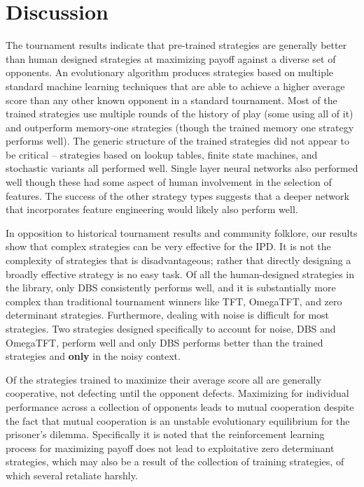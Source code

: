 \documentclass{article}
\begin{document}
\section{Discussion}

The tournament results indicate that pre-trained strategies are generally better
than human designed strategies at maximizing payoff against a diverse set of
opponents. An evolutionary algorithm produces strategies based on multiple
standard machine learning techniques that are able to achieve a higher average
score than any other known opponent in a standard tournament. Most of the trained
strategies use multiple rounds of the history of play (some using all of it) and
outperform memory-one strategies (though the trained memory one strategy performs
well). The generic structure of the trained strategies did not appear to be
critical -- strategies based on lookup tables, finite state machines, and stochastic
variants all performed well. Single layer neural networks also performed well
though these had some aspect of human involvement in the selection of features.
The success of the other strategy types suggests that a deeper network that
incorporates feature engineering would likely also perform well.

In opposition to historical tournament results and community folklore,
our results show that complex strategies can be very effective for the
IPD\@. It is not the complexity of strategies that is disadvantageous; rather that directly
designing a broadly effective strategy is no easy task. Of all the human-designed
strategies in the library, only DBS consistently performs well, and it is
substantially more complex than traditional tournament winners like TFT, OmegaTFT,
and zero determinant strategies. Furthermore, dealing with noise is difficult
for most strategies. Two strategies designed specifically to account for noise,
DBS and OmegaTFT, perform well and only DBS performs better than the trained
strategies and \textbf{only} in the noisy context.

Of the strategies trained to maximize their average score all are generally
cooperative, not defecting until the opponent defects. Maximizing for individual
performance across a collection of opponents leads to mutual cooperation despite
the fact that mutual cooperation is an unstable evolutionary equilibrium for the prisoner's
dilemma. Specifically it is noted that the reinforcement learning process for maximizing
payoff does not lead to exploitative zero determinant strategies, which may also
be a result of the collection of training strategies, of which several retaliate harshly.
\end{document}
